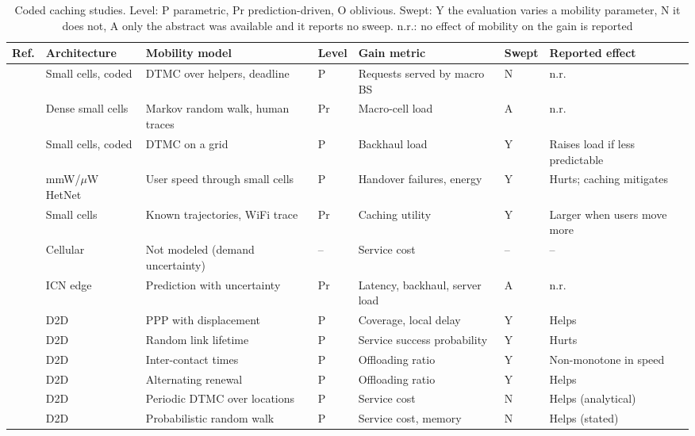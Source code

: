 \begin{table}[!t]
\centering
\caption{Coded caching studies. Level: P parametric, Pr prediction-driven, O oblivious. Swept: Y the evaluation varies a mobility parameter, N it does not, A only the abstract was available and it reports no sweep. n.r.: no effect of mobility on the gain is reported}
\label{tab:corpus}
\footnotesize
\renewcommand{\arraystretch}{1.15}
\setlength{\tabcolsep}{1.8pt}
\begin{tabular*}{\textwidth}{@{\extracolsep{\fill}}lllllll@{}}
\hline
Ref. & Architecture & Mobility model & Level & Gain metric & Swept & Reported effect \\
\hline
\cite{poularakis2013exploiting} & Small cells, coded & DTMC over helpers, deadline & P & Requests served by macro BS & N & n.r. \\
\cite{poularakis2017code} & Dense small cells & Markov random walk, human traces & Pr & Macro-cell load & A & n.r. \\
\cite{ozfatura2020mobility} & Small cells, coded & DTMC on a grid & P & Backhaul load & Y & Raises load if less predictable \\
\cite{semiari2018caching} & mmW/$\mu$W HetNet & User speed through small cells & P & Handover failures, energy & Y & Hurts; caching mitigates \\
\cite{guan2014mobicacher} & Small cells & Known trajectories, WiFi trace & Pr & Caching utility & Y & Larger when users move more \\
\cite{tadrous2016optimal} & Cellular & Not modeled (demand uncertainty) & -- & Service cost & -- & -- \\
\cite{abani2017proactive} & ICN edge & Prediction with uncertainty & Pr & Latency, backhaul, server load & A & n.r. \\
\hline
\cite{krishnan2017mobility} & D2D & PPP with displacement & P & Coverage, local delay & Y & Helps \\
\cite{jarray2016mobility} & D2D & Random link lifetime & P & Service success probability & Y & Hurts \\
\cite{wang2017mobility} & D2D & Inter-contact times & P & Offloading ratio & Y & Non-monotone in speed \\
\cite{wang2018exploiting} & D2D & Alternating renewal & P & Offloading ratio & Y & Helps \\
\cite{hosny2016allerton} & D2D & Periodic DTMC over locations & P & Service cost & N & Helps (analytical) \\
\cite{hosny2016globecom} & D2D & Probabilistic random walk & P & Service cost, memory & N & Helps (stated) \\

\end{tabular*}
\end{table}
